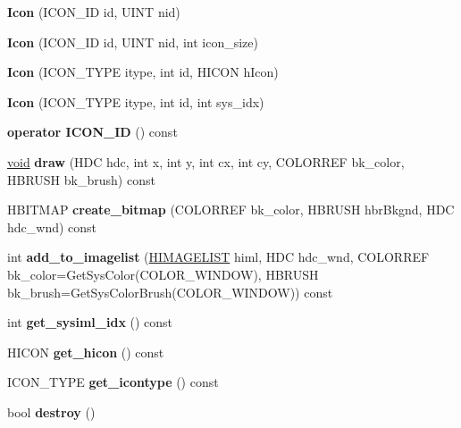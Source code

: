 \begin{DoxyCompactItemize}
\item 
\mbox{\label{struct_icon_aaea7154077bf307262253f316f0fae72}} 
{\bfseries Icon} (I\+C\+O\+N\+\_\+\+ID id, U\+I\+NT nid)
\item 
\mbox{\label{struct_icon_ac9ad6f29d24408da4ecb2fd875637625}} 
{\bfseries Icon} (I\+C\+O\+N\+\_\+\+ID id, U\+I\+NT nid, int icon\+\_\+size)
\item 
\mbox{\label{struct_icon_a90331860552520fc15c7df4d002eb126}} 
{\bfseries Icon} (I\+C\+O\+N\+\_\+\+T\+Y\+PE itype, int id, H\+I\+C\+ON h\+Icon)
\item 
\mbox{\label{struct_icon_a8219b48833a7b0150eee17904558a910}} 
{\bfseries Icon} (I\+C\+O\+N\+\_\+\+T\+Y\+PE itype, int id, int sys\+\_\+idx)
\item 
\mbox{\label{struct_icon_a1164f87fddc48c66fdbb8213b838aaba}} 
{\bfseries operator I\+C\+O\+N\+\_\+\+ID} () const
\item 
\mbox{\label{struct_icon_a1586f238b67080c498d8872d3973d3b5}} 
\hyperlink{interfacevoid}{void} {\bfseries draw} (H\+DC hdc, int x, int y, int cx, int cy, C\+O\+L\+O\+R\+R\+EF bk\+\_\+color, H\+B\+R\+U\+SH bk\+\_\+brush) const
\item 
\mbox{\label{struct_icon_a455cf56c52000f5a792e464770225848}} 
H\+B\+I\+T\+M\+AP {\bfseries create\+\_\+bitmap} (C\+O\+L\+O\+R\+R\+EF bk\+\_\+color, H\+B\+R\+U\+SH hbr\+Bkgnd, H\+DC hdc\+\_\+wnd) const
\item 
\mbox{\label{struct_icon_a53019f5c37b4964cbfc3ab8808e8a6fb}} 
int {\bfseries add\+\_\+to\+\_\+imagelist} (\hyperlink{struct___i_m_a_g_e_l_i_s_t}{H\+I\+M\+A\+G\+E\+L\+I\+ST} himl, H\+DC hdc\+\_\+wnd, C\+O\+L\+O\+R\+R\+EF bk\+\_\+color=Get\+Sys\+Color(C\+O\+L\+O\+R\+\_\+\+W\+I\+N\+D\+OW), H\+B\+R\+U\+SH bk\+\_\+brush=Get\+Sys\+Color\+Brush(C\+O\+L\+O\+R\+\_\+\+W\+I\+N\+D\+OW)) const
\item 
\mbox{\label{struct_icon_a36e63612a9ac67f8ad8aae643e9c0aaf}} 
int {\bfseries get\+\_\+sysiml\+\_\+idx} () const
\item 
\mbox{\label{struct_icon_a385930bfb7900dae0173957b6e3b7147}} 
H\+I\+C\+ON {\bfseries get\+\_\+hicon} () const
\item 
\mbox{\label{struct_icon_a7755ea2341739d72051e2094d0943951}} 
I\+C\+O\+N\+\_\+\+T\+Y\+PE {\bfseries get\+\_\+icontype} () const
\item 
\mbox{\label{struct_icon_a6b5cd3c4ca5fd571e79d3a96ad9819e9}} 
bool {\bfseries destroy} ()
\end{DoxyCompactItemize}

